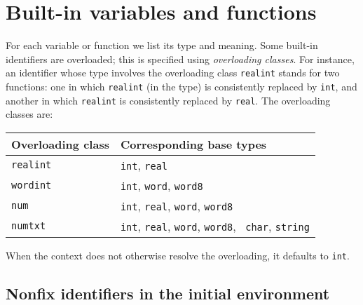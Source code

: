 \documentclass[fleqn]{article}
\begin{document}
\newpage

\section{Built-in variables and functions}

For each variable or function we list its type and meaning.  Some
built-in identifiers are overloaded; this is specified using {\em
  overloading classes\/}.  For instance, an identifier whose type
involves the overloading class {\tt realint} stands for two functions:
one in which {\tt realint} (in the type) is consistently replaced by
{\tt int}, and another in which {\tt realint} is consistently replaced
by {\tt real}.  The overloading classes are:

\begin{center}
\begin{tabular}{|l|l|}\hline
Overloading class & Corresponding base types\\\hline
{\tt realint} & {\tt int}, {\tt real}\\
{\tt wordint} & {\tt int}, {\tt word}, {\tt word8}\\
{\tt num} &  {\tt int}, {\tt real}, {\tt word}, {\tt word8}\\
{\tt numtxt} &  {\tt int}, {\tt real}, {\tt word}, {\tt word8}, {\tt
  char}, {\tt string}\\\hline
\end{tabular}
\end{center}

\noindent When the context does not otherwise resolve the overloading,
it defaults to {\tt int}.


\subsection*{Nonfix identifiers in the initial environment}
\end{document}
